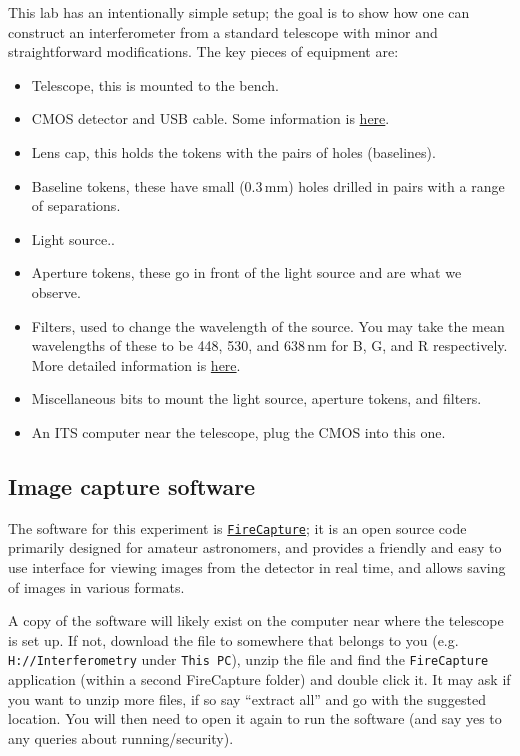 \documentclass[11pt]{article}
\begin{document}
This lab has an intentionally simple setup; the goal is to show how one can construct an interferometer from a standard telescope with minor and straightforward modifications. The key pieces of equipment are:
\begin{itemize}
    \item Telescope, this is mounted to the bench.
    \item CMOS detector and USB cable. Some information is \href{https://www.qhyccd.com/qhy5l-ii-planetary-guiding-camera/}{here}.
    \item Lens cap, this holds the tokens with the pairs of holes (baselines).
    \item Baseline tokens, these have small (0.3\,mm) holes drilled in pairs with a range of separations.
    \item Light source..
    \item Aperture tokens, these go in front of the light source and are what we observe.
    \item Filters, used to change the wavelength of the source. You may take the mean wavelengths of these to be 448, 530, and 638\,nm for B, G, and R respectively. More detailed information is \href{https://www.firstlightoptics.com/rgb-filters-filter-sets/zwo-2-lrgb-filter-set.html}{here}.
    \item Miscellaneous bits to mount the light source, aperture tokens, and filters.
    \item An ITS computer near the telescope, plug the CMOS into this one.
\end{itemize}

\subsection{Image capture software}\label{sec:software}

The software for this experiment is \href{http://www.firecapture.de/}{\texttt{FireCapture}}; it is an open source code primarily designed for amateur astronomers, and provides a friendly and easy to use interface for viewing images from the detector in real time, and allows saving of images in various formats.

A copy of the software will likely exist on the computer near where the telescope is set up. If not, download the file to somewhere that belongs to you (e.g. \texttt{H://Interferometry} under \texttt{This PC}), unzip the file and find the \texttt{FireCapture} application (within a second FireCapture folder) and double click it. It may ask if you want to unzip more files, if so say ``extract all'' and go with the suggested location. You will then need to open it again to run the software (and say yes to any queries about running/security).
\end{document}

